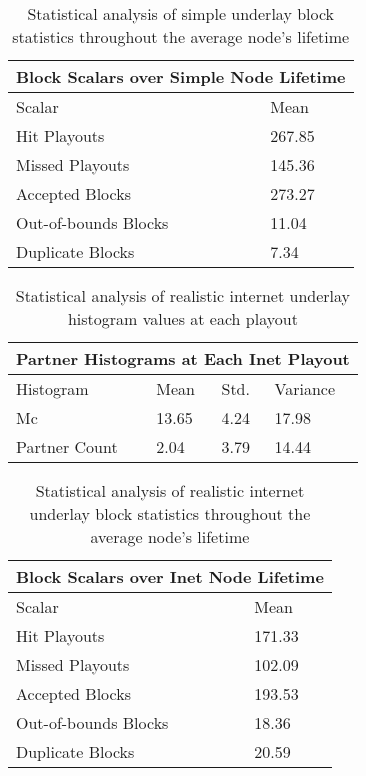 \documentclass[12pt,a4paper]{article}
\begin{document}
\begin{table}[h!]
	\centering
	\begin{tabular}{ |p{6cm}||p{3cm}|  }
		\hline
		\multicolumn{2}{|c|}{Block Scalars over Simple Node Lifetime} \\
		\hline
		Scalar & Mean \\
		\hline
		Hit Playouts   & 267.85 \\
		Missed Playouts   & 145.36 \\
		Accepted Blocks   & 273.27 \\
		Out-of-bounds Blocks   & 11.04 \\
		Duplicate Blocks   & 7.34 \\
		\hline
	\end{tabular} 
	\caption{Statistical analysis of simple underlay block statistics throughout the average node's lifetime}
	\label{simple_scalar}
\end{table}

\begin{table}[h!]
	\centering
	\begin{tabular}{ |p{3cm}||p{3cm}|p{3cm}|p{3cm}|  }
		\hline
		\multicolumn{4}{|c|}{Partner Histograms at Each Inet Playout} \\
		\hline
		Histogram & Mean & Std. & Variance \\
		\hline
		Mc   & 13.65    & 4.24 &   17.98\\
		Partner Count &   2.04  & 3.79  & 14.44 \\
		\hline
	\end{tabular} 
	\caption{Statistical analysis of realistic internet underlay histogram values at each playout}
	\label{inet_histogram}
\end{table}

\begin{table}[h!]
	\centering
	\begin{tabular}{ |p{6cm}||p{3cm}|  }
		\hline
		\multicolumn{2}{|c|}{Block Scalars over Inet Node Lifetime} \\
		\hline
		Scalar & Mean \\
		\hline
		Hit Playouts   & 171.33 \\
		Missed Playouts   & 102.09 \\
		Accepted Blocks   & 193.53 \\
		Out-of-bounds Blocks   & 18.36 \\
		Duplicate Blocks   & 20.59 \\
		\hline
	\end{tabular} 
	\caption{Statistical analysis of realistic internet underlay block statistics throughout the average node's lifetime}
	\label{inet_scalar}
\end{table}
\end{document}
